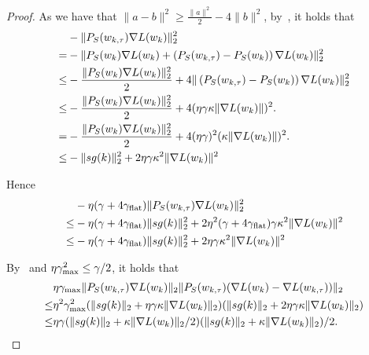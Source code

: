 \begin{proof}
    As we have that $\| a - b \|^2 \ge \frac{\| a\|^2}{2} - 4\| b\|^2$, by~, it holds that
    \begin{align*}
     &- \| {P}_S(w_{k, \tau}) \nabla L(w_k)\|_2^2 \\
        =&-\| {P}_S(w_k) \nabla L(w_k) + \left(  {P}_S(w_{k, \tau}) - {P}_S(w_k)\right) \nabla L(w_k)\|_2^2 \\ \le& - \frac{\| {P}_S(w_k) \nabla L(w_k)\|_2^2}{2} + 4\| \left(  {P}_S(w_{k, \tau}) - {P}_S(w_k)\right) \nabla L(w_k) \|_2^2 \\
        \le&  -\frac{\| {P}_S(w_k) \nabla L(w_k)\|_2^2}{2} + 4  (\eta \gamma \kappa \| \nabla  L(w_k) \|)^2. \\
        =& - \frac{\| {P}_S(w_k) \nabla L(w_k)\|_2^2}{2} + 4 (\eta\gamma)^2  (\kappa \| \nabla  L(w_k) \|)^2. \\
        \le& -\| sg(k)\|_2^2  + 2\eta\gamma \kappa^2 \| \nabla  L(w_k) \|^2
    \end{align*}

    Hence 
    \begin{align*}
         &-\eta (\gamma  + 4 \gamma_{\mathrm{flat}})\| {P}_S(w_{k, \tau}) \nabla L(w_k)\|_2^2 \\
         \le&   -\eta (\gamma  + 4 \gamma_{\mathrm{flat}}) \| sg(k)\|_2^2  + 2\eta^2 (\gamma  + 4 \gamma_{\mathrm{flat}})\gamma \kappa^2 \| \nabla  L(w_k) \|^2 \\
         \le&   -\eta (\gamma  + 4 \gamma_{\mathrm{flat}}) \| sg(k)\|_2^2  + 2\eta \gamma \kappa^2 \| \nabla  L(w_k) \|^2
    \end{align*}

    By~ and $\eta \gamma_{\mathrm{max}}^2 \le \gamma / 2$, it holds that
    \begin{align*}
         &\eta \gamma_{\mathrm{max}} \| {P}_S(w_{k, \tau}) \nabla L(w_k) \|_2 \|{P}_S(w_{k, \tau}) (\nabla L(w_k) - \nabla L(w_{k,\tau})) \|_2 \\
         \le& \eta^2 \gamma_{\mathrm{max}}^2  (\| sg(k) \|_2 + \eta  \gamma \kappa \|\nabla L(w_k)\|_2) (\| sg(k) \|_2 + 2\eta  \gamma \kappa \|\nabla L(w_k)\|_2)\\
         \le& \eta \gamma  (\| sg(k) \|_2 +  \kappa \|\nabla L(w_k)\|_2/2) (\| sg(k) \|_2 +  \kappa \|\nabla L(w_k)\|_2)/2.
    \end{align*}






 


\end{proof}

